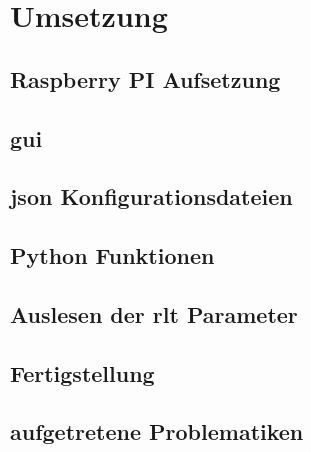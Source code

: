 \chapter{Umsetzung}

\section{Raspberry PI Aufsetzung}
\setAuthor{\pezze}


\section{\acf{gui}}\label{gui_design}
\setAuthor{\pezze}



\section{\acs{json} Konfigurationsdateien}
\setAuthor{\pezze}



\setAuthor{\schneider}


\section{Python Funktionen}
\setAuthor{\pezze}


\section{Auslesen der \acs{rlt} Parameter}
\setAuthor{\schneider}


\section{Fertigstellung}
\setAuthor{\schneider}


\setAuthor{\pezze}



\newpage
\section{aufgetretene Problematiken}
\setAuthor{\mangeng}

